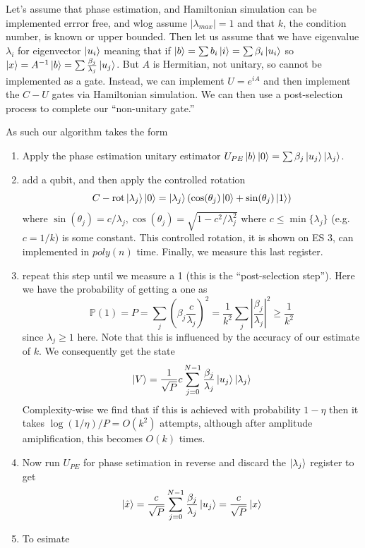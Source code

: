 \documentclass{article}
\theoremstyle{definition}
\begin{document}
Let's assume that phase estimation, and Hamiltonian simulation can be
implemented errror free, and wlog assume $|\lambda_{max}| = 1$ and that $k$, the
condition number, is known or upper bounded. Then let us assume that we have
eigenvalue $\lambda_i$ for eigenvector $\ket{u_i}$ meaning that if $\ket{b} =
\sum b_i \ket{i} = \sum \beta_i \ket{u_i}$ so $\ket{x} = A^{-1} \ket{b} = \sum
\frac{\beta_j}{\lambda_j} \ket{u_j}$. But $A$ is Hermitian, not unitary, so
cannot be implemented as a gate. Instead, we can implement $U = e^{iA}$ and then
implement the $C-U$ gates via Hamiltonian simulation. We can then use a
post-selection process to complete our ``non-unitary gate.''

As such our algorithm takes the form

\begin{enumerate}
\item Apply the phase estimation unitary estimator $U_{PE} \ket{b} \ket{0} =
  \sum \beta_j \ket{u_j} \ket{\lambda_j}$.
\item add a qubit, and then apply the controlled rotation
$$ C-\text{rot} \ket{\lambda_j} \ket{0} = \ket{\lambda_j} \left( \cos(\theta_j)
  \ket{0} + \sin(\theta_j) \ket{1} \right) $$
where $\sin(\theta_j) = c / \lambda_j, \cos(\theta_j) = \sqrt{1 - c^2 /
  \lambda_j^2}$ where $c \leq \min \{ \lambda_j \}$ (e.g. $c = 1 / k$) is some
constant. This controlled rotation, it is shown on ES 3, can implemented in
$poly(n)$ time. Finally, we measure this last register.
\item repeat this step until we measure a 1 (this is the ``post-selection
  step''). Here we have the probability of getting a one as
$$ \mathbb{P}(1) = P = \sum_j \left( \beta_j \frac{c}{\lambda_j} \right)^2 =
\frac{1}{k^2} \sum_j \left| \frac{\beta_j}{\lambda_j} \right|^2 \geq \frac{1}{k^2} $$
since $\lambda_j \geq 1$ here. Note that this is influenced by the accuracy of
our estimate of $k$. We consequently get the state
$$ \ket{V} = \frac{1}{\sqrt{P}} c \sum_{j = 0}^{N - 1} \frac{\beta_j}{\lambda_j}
\ket{u_j} \ket{\lambda_j} $$
Complexity-wise we find that if this is achieved with probability $1 - \eta$
then it takes $\log(1 / \eta) / P = O(k^2)$ attempts, although after amplitude
amiplification, this becomes $O(k)$ times.
\item Now run $U_{PE}$ for phase setimation in reverse and discard the
  $\ket{\lambda_j}$ register to get
$$ \ket{\hat{x}} = \frac{c}{\sqrt{P}} \sum_{j = 0}^{N - 1}
\frac{\beta_j}{\lambda_j} \ket{u_j} = \frac{c}{\sqrt{P}} \ket{x} $$
\item To esimate

\end{enumerate}
\end{document}

